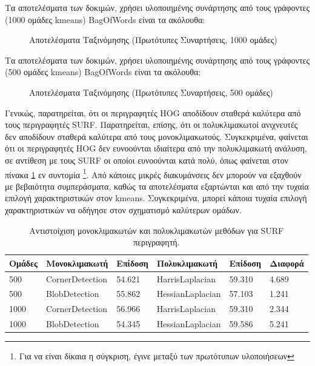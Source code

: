 \documentclass{article}
\newcommand{\eng}[1]{\foreignlanguage{english}{#1}}
\begin{document}
Τα αποτελέσματα των δοκιμών, χρήσει υλοποιημένης συνάρτησης από τους γράφοντες (1000 ομάδες \eng{kmeans}) \eng{BagOfWords} είναι τα ακόλουθα:

\begin{figure}[h]
    
    \caption{Αποτελέσματα Ταξινόμησης (Πρωτότυπες Συναρτήσεις, 1000 ομάδες)}
\end{figure}
\FloatBarrier

Τα αποτελέσματα των δοκιμών, χρήσει υλοποιημένης συνάρτησης από τους γράφοντες (500 ομάδες \eng{kmeans}) \eng{BagOfWords} είναι τα ακόλουθα:

\begin{figure}[h]
    
    \caption{Αποτελέσματα Ταξινόμησης (Πρωτότυπες Συναρτήσεις, 500 ομάδες)}
\end{figure}
\FloatBarrier

Γενικώς, παρατηρείται, ότι οι περιγραφητές \eng{HOG} αποδίδουν σταθερά καλύτερα από τους περιγραφητές \eng{SURF}. Παρατηρείται, επίσης, ότι οι πολυκλιμακωτοί ανιχνευτές δεν αποδίδουν σταθερά καλύτερα από τους μονοκλιμακωτούς. Συγκεκριμένα, φαίνεται ότι οι περιγραφητές \eng{HOG} δεν ευνοούνται ιδιαίτερα από την πολυκλιμακωτή ανάλυση, σε αντίθεση με τους \eng{SURF} οι οποίοι ευνοούνται κατά πολύ, όπως φαίνεται στον πίνακα \ref{tab:mytable} εν συντομία \footnote{Για να είναι δίκαια η σύγκριση, έγινε μεταξύ των πρωτότυπων υλοποιήσεων}. Από κάποιες μικρές διακυμάνσεις δεν μπορούν να εξαχθούν με βεβαιότητα συμπεράσματα, καθώς τα αποτελέσματα εξαρτώνται και από την τυχαία επιλογή χαρακτηριστικών στον kmeans. Συγκεκριμένα, μπορεί κάποια τυχαία επιλογή χαρακτηριστικών να οδήγησε στον σχηματισμό καλύτερων ομάδων. 

\begin{table}[htbp]
  \centering
  \caption{Αντιστοίχιση μονοκλιμακωτών και πολυκλιμακωτών μεθόδων για \eng{SURF} περιγραφητή.}
    \begin{tabular}{|l|l|l|l|l|l|}
    \toprule
    Ομάδες & Μονοκλιμακωτή & Επίδοση & Πολυκλιμακωτή & Επίδοση & Διαφορά\\
    \midrule
    500 & \eng{CornerDetection} & 54.621 & \eng{HarrisLaplacian} & 59.310 & 4.689 \\
    500 & \eng{BlobDetection} & 55.862 & \eng{HessianLaplacian} & 57.103 & 1.241\\
    1000 & \eng{CornerDetection} & 56.966 & \eng{HarrisLaplacian} & 59.310 & 2.344\\
    1000 & \eng{BlobDetection} & 54.345 & \eng{HessianLaplacian} & 59.586 & 5.241\\
    \bottomrule
    \end{tabular}%
  \label{tab:mytable}%
\end{table}%
\end{document}
